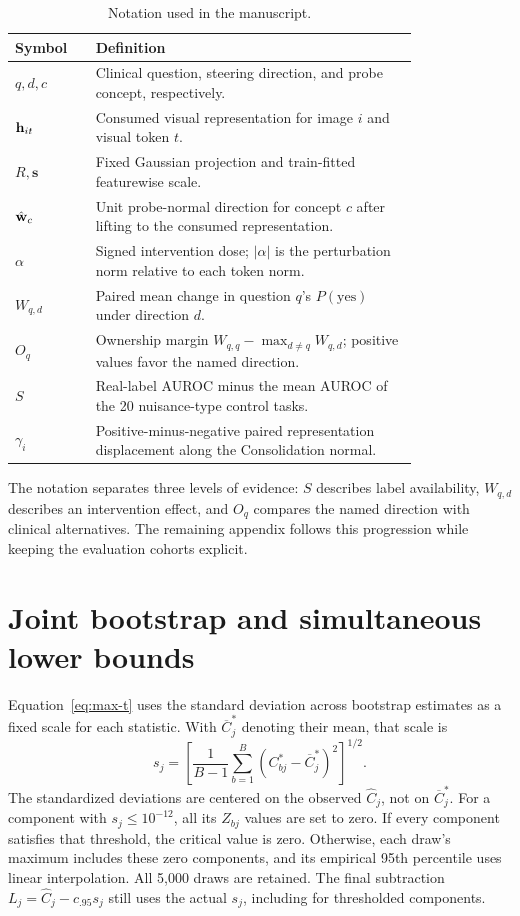 \documentclass{article}
\begin{document}
\begin{table}[H]
\centering
\caption{Notation used in the manuscript.}
\label{tab:notation}
\begin{tabular}{l>{\raggedright\arraybackslash}p{0.8\linewidth}}
\toprule
Symbol & Definition \\
\midrule
$q,d,c$ & Clinical question, steering direction, and probe concept, respectively. \\
$\mathbf{h}_{it}$ & Consumed visual representation for image $i$ and visual token $t$. \\
$R,\boldsymbol{s}$ & Fixed Gaussian projection and train-fitted featurewise scale. \\
$\hat{\mathbf{w}}_c$ & Unit probe-normal direction for concept $c$ after lifting to the consumed representation. \\
$\alpha$ & Signed intervention dose; $|\alpha|$ is the perturbation norm relative to each token norm. \\
$W_{q,d}$ & Paired mean change in question $q$'s $P(\mathrm{yes})$ under direction $d$. \\
$O_q$ & Ownership margin $W_{q,q}-\max_{d\neq q}W_{q,d}$; positive values favor the named direction. \\
$S$ & Real-label AUROC minus the mean AUROC of the 20 nuisance-type control tasks. \\
$\gamma_i$ & Positive-minus-negative paired representation displacement along the Consolidation normal. \\
\bottomrule
\end{tabular}
\end{table}

The notation separates three levels of evidence: $S$ describes label
availability, $W_{q,d}$ describes an intervention effect, and $O_q$ compares
the named direction with clinical alternatives. The remaining appendix
follows this progression while keeping the evaluation cohorts explicit.

\FloatBarrier

\section{Joint bootstrap and simultaneous lower bounds}
\label{app:simultaneous-bounds}

Equation~\ref{eq:max-t} uses the standard deviation across bootstrap
estimates as a fixed scale for each statistic. With $\overline C^*_j$
denoting their mean, that scale is
\begin{equation}
s_j=\left[\frac{1}{B-1}\sum_{b=1}^{B}
       (C^*_{bj}-\overline C^*_j)^2\right]^{1/2}.
\label{eq:bootstrap-scale}
\end{equation}
The standardized deviations are centered on the observed $\widehat C_j$,
not on $\overline C^*_j$. For a component with $s_j\leq10^{-12}$,
all its $Z_{bj}$ values are set to zero. If every component satisfies
that threshold, the critical value is zero. Otherwise, each draw's
maximum includes these zero components, and its empirical 95th percentile
uses linear interpolation. All 5,000 draws are retained. The final
subtraction $L_j=\widehat C_j-c_{.95}s_j$ still uses the actual $s_j$,
including for thresholded components.
\end{document}
